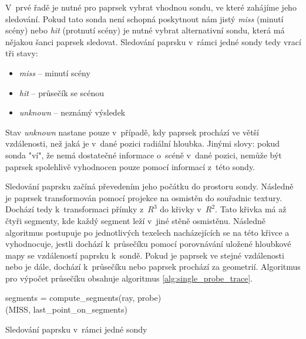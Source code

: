 V~prvé řadě je nutné pro paprsek vybrat vhodnou sondu, ve které zahájíme jeho sledování. Pokud tato sonda není schopná poskytnout nám jistý \textit{miss} (minutí scény) nebo \textit{hit} (protnutí scény) je nutné vybrat alternativní sondu, která má nějakou šanci paprsek sledovat. Sledování paprsku v~rámci jedné sondy tedy vrací tři stavy:
\begin{itemize}
    \item \textit{miss} -- minutí scény
    \item \textit{hit} -- průsečík se scénou
    \item \textit{unknown} -- neznámý výsledek
\end{itemize}

Stav \textit{unknown} nastane pouze v~případě, kdy paprsek prochází ve větší vzdálenosti, než jaká je v~dané pozici radiální hloubka. Jinými slovy: pokud sonda "ví", že nemá dostatečné informace o~scéně v~dané pozici, nemůže být paprsek spolehlivě vyhodnocen pouze pomocí informací z~této sondy.

Sledování paprsku začíná převedením jeho počátku do prostoru sondy. Následně je paprsek transformován pomocí projekce na osmistěn do souřadnic textury. Dochází tedy k~transformaci přímky z~$R^3$ do křivky v~$R^2$. Tato křivka má až čtyři segmenty, kde každý segment leží v~jiné stěně osmistěnu. Následně algoritmus postupuje po jednotlivých texelech nacházejících se na této křivce a vyhodnocuje, jestli dochází k~průsečíku pomocí porovnávání uložené hloubkové mapy se vzdáleností paprsku k~sondě. Pokud je paprsek ve stejné vzdálenosti nebo je dále, dochází k~průsečíku nebo paprsek prochází za geometrií. Algoritmus pro výpočet průsečíku obsahuje algoritmus \ref{alg:single_probe_trace}.

\begin{center}
	\begin{czechalgorithm}[H] \label{alg:single_probe_trace}
	    segments = compute\_segments(ray, probe)\\
	    \KwRet (MISS, last\_point\_on\_segments)
		\caption{Sledování paprsku v~rámci jedné sondy}
	\end{czechalgorithm}
\end{center}


